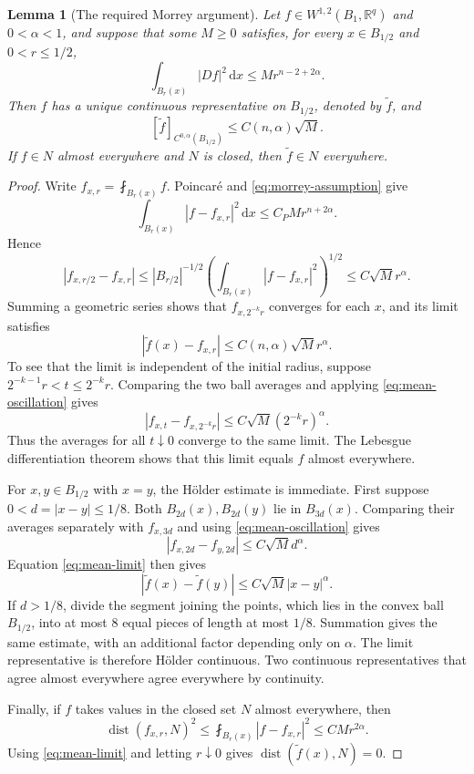 \documentclass[11pt,a4paper]{article}
\numberwithin{equation}{section}
\newtheorem{lemma}[theorem]{Lemma}
\theoremstyle{definition}
\newcommand{\R}{\mathbb R}
\newcommand{\dd}{\,\mathrm d}
\newcommand{\dx}{\dd x}
\newcommand{\dist}{\operatorname{dist}}
\newcommand{\avint}{\mathop{\fint}}
\newcommand{\W}{W^{1,2}}
\begin{document}
\begin{lemma}[The required Morrey argument]\label{lem:morrey}
Let $f\in\W(B_1,\R^q)$ and $0<\alpha<1$, and suppose that some $M\ge0$ satisfies, for every $x\in B_{1/2}$ and $0<r\le1/2$,
\begin{equation}\label{eq:morrey-assumption}
\int_{B_r(x)}|Df|^2\dx\le M r^{n-2+2\alpha}.
\end{equation}
Then $f$ has a unique continuous representative on $B_{1/2}$, denoted by $\widetilde f$, and
\begin{equation}\label{eq:morrey-conclusion}
[\widetilde f]_{C^{0,\alpha}(B_{1/2})}
\le C(n,\alpha)\sqrt M.
\end{equation}
If $f\in N$ almost everywhere and $N$ is closed, then $\widetilde f\in N$ everywhere.
\end{lemma}
\begin{proof}
Write $f_{x,r}=\avint_{B_r(x)}f$. Poincaré and \eqref{eq:morrey-assumption} give
\begin{equation}\label{eq:mean-oscillation}
\int_{B_r(x)}|f-f_{x,r}|^2\dx
\le C_PM r^{n+2\alpha}.
\end{equation}
Hence
\[
|f_{x,r/2}-f_{x,r}|
\le|B_{r/2}|^{-1/2}\left(\int_{B_r(x)}|f-f_{x,r}|^2\right)^{1/2}
\le C\sqrt M r^\alpha.
\]
Summing a geometric series shows that $f_{x,2^{-k}r}$ converges for each $x$, and its limit satisfies
\begin{equation}\label{eq:mean-limit}
|\widetilde f(x)-f_{x,r}|\le C(n,\alpha)\sqrt M r^\alpha.
\end{equation}
To see that the limit is independent of the initial radius, suppose $2^{-k-1}r<t\le2^{-k}r$. Comparing the two ball averages and applying \eqref{eq:mean-oscillation} gives
\[
|f_{x,t}-f_{x,2^{-k}r}|\le C\sqrt M(2^{-k}r)^\alpha.
\]
Thus the averages for all $t\downarrow0$ converge to the same limit. The Lebesgue differentiation theorem shows that this limit equals $f$ almost everywhere.

For $x,y\in B_{1/2}$ with $x=y$, the Hölder estimate is immediate. First suppose $0<d=|x-y|\le1/8$. Both $B_{2d}(x),B_{2d}(y)$ lie in $B_{3d}(x)$. Comparing their averages separately with $f_{x,3d}$ and using \eqref{eq:mean-oscillation} gives
\[
|f_{x,2d}-f_{y,2d}|\le C\sqrt M d^\alpha.
\]
Equation \eqref{eq:mean-limit} then gives
\[
|\widetilde f(x)-\widetilde f(y)|\le C\sqrt M|x-y|^\alpha.
\]
If $d>1/8$, divide the segment joining the points, which lies in the convex ball $B_{1/2}$, into at most $8$ equal pieces of length at most $1/8$. Summation gives the same estimate, with an additional factor depending only on $\alpha$. The limit representative is therefore Hölder continuous. Two continuous representatives that agree almost everywhere agree everywhere by continuity.

Finally, if $f$ takes values in the closed set $N$ almost everywhere, then
\[
\dist(f_{x,r},N)^2\le\avint_{B_r(x)}|f-f_{x,r}|^2\le CM r^{2\alpha}.
\]
Using \eqref{eq:mean-limit} and letting $r\downarrow0$ gives $\dist(\widetilde f(x),N)=0$.
\end{proof}
\end{document}

